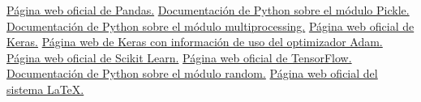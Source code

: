 \documentclass[conference,a4paper]{IEEEtran}
\begin{document}
\begin{thebibliography}{00}
 \href{https://pandas.pydata.org/}{Página web oficial de Pandas.}
 \href{https://docs.python.org/3/library/pickle.html}{Documentación de Python sobre el módulo Pickle.}
 \href{https://docs.python.org/3/library/multiprocessing.html}{Documentación de Python sobre el módulo multiprocessing.}
 \href{https://keras.io/}{Página web oficial de Keras.}
 \href{https://keras.io/api/optimizers/adam/}{Página web de Keras con información de uso del optimizador Adam.}
 \href{https://scikit-learn.org/stable/}{Página web oficial de Scikit Learn.}
 \href{https://www.tensorflow.org/}{Página web oficial de TensorFlow.}
 \href{https://docs.python.org/3/library/random.html}{Documentación de Python sobre el módulo random.}
 \href{https://www.latex-project.org}{Página web oficial del sistema LaTeX.}
\end{thebibliography}
\end{document}
